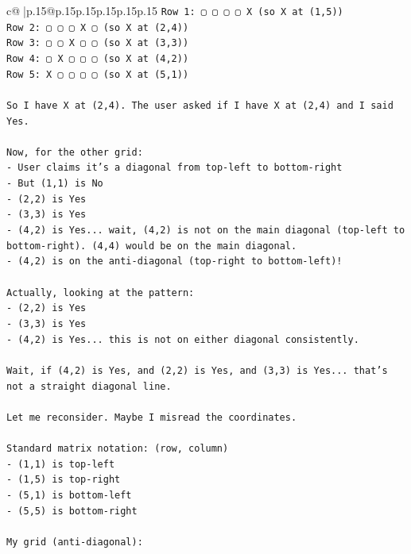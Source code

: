 \documentclass{article}
\begin{document}
{\begin{supertabular}{c@{$\;$}|p{.15\linewidth}@{}p{.15\linewidth}p{.15\linewidth}p{.15\linewidth}p{.15\linewidth}p{.15\linewidth}}
{{{\texttt{Row 1: ▢ ▢ ▢ ▢ X  (so X at (1,5))} \\
\texttt{Row 2: ▢ ▢ ▢ X ▢  (so X at (2,4))} \\
\texttt{Row 3: ▢ ▢ X ▢ ▢  (so X at (3,3))} \\
\texttt{Row 4: ▢ X ▢ ▢ ▢  (so X at (4,2))} \\
\texttt{Row 5: X ▢ ▢ ▢ ▢  (so X at (5,1))} \\
\\ 
\texttt{So I have X at (2,4). The user asked if I have X at (2,4) and I said Yes.} \\
\\ 
\texttt{Now, for the other grid:} \\
\texttt{{-} User claims it's a diagonal from top{-}left to bottom{-}right} \\
\texttt{{-} But (1,1) is No} \\
\texttt{{-} (2,2) is Yes} \\
\texttt{{-} (3,3) is Yes} \\
\texttt{{-} (4,2) is Yes... wait, (4,2) is not on the main diagonal (top{-}left to bottom{-}right). (4,4) would be on the main diagonal.} \\
\texttt{{-} (4,2) is on the anti{-}diagonal (top{-}right to bottom{-}left)!} \\
\\ 
\texttt{Actually, looking at the pattern:} \\
\texttt{{-} (2,2) is Yes} \\
\texttt{{-} (3,3) is Yes  } \\
\texttt{{-} (4,2) is Yes... this is not on either diagonal consistently.} \\
\\ 
\texttt{Wait, if (4,2) is Yes, and (2,2) is Yes, and (3,3) is Yes... that's not a straight diagonal line.} \\
\\ 
\texttt{Let me reconsider. Maybe I misread the coordinates.} \\
\\ 
\texttt{Standard matrix notation: (row, column)} \\
\texttt{{-} (1,1) is top{-}left} \\
\texttt{{-} (1,5) is top{-}right} \\
\texttt{{-} (5,1) is bottom{-}left} \\
\texttt{{-} (5,5) is bottom{-}right} \\
\\ 
\texttt{My grid (anti{-}diagonal):} \\
}}}
\end{supertabular}}
\end{document}
